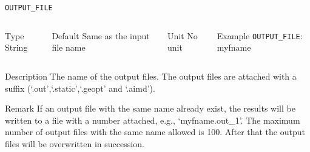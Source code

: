 \begin{frame}[allowframebreaks]{\texttt{OUTPUT\_FILE}} \label{OUTPUT_FILE}
\vspace*{-12pt}
\begin{columns}
\begin{block}{Type}
String
\end{block}

\begin{block}{Default}
Same as the input file name
\end{block}

\begin{block}{Unit}
No unit
\end{block}

\begin{block}{Example}
\texttt{OUTPUT\_FILE}: myfname
\end{block}
\end{columns}

\begin{block}{Description}
The name of the output files. The output files are attached with a suffix (`.out',`.static',`.geopt' and `.aimd'). 
\end{block}

\begin{block}{Remark}
If an output file with the same name already exist, the results will be written to a file with a number attached, e.g., `myfname.out\_1'. The maximum number of output files with the same name allowed is 100. After that the output files will be overwritten in succession.
\end{block}

\end{frame}



